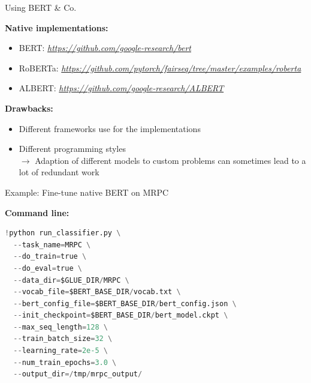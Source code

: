 \documentclass[]{beamer}
\begin{document}
\begin{frame}{Using BERT \& Co.}

\textbf{Native implementations:}

		\begin{itemize}
			\item BERT: \href{https://github.com/google-research/bert}{\textit{https://github.com/google-research/bert}}
			\item RoBERTa: \small\href{https://github.com/pytorch/fairseq/tree/master/examples/roberta}{\textit{https://github.com/pytorch/fairseq/tree/master/examples/roberta}}\normalsize
			\item ALBERT: \href{https://github.com/google-research/ALBERT}{\textit{https://github.com/google-research/ALBERT}}\normalsize
		\end{itemize}

\vspace{.3cm}

\textbf{Drawbacks:}

		\begin{itemize}
			\item Different frameworks use for the implementations
			\item Different programming styles\\
						$\rightarrow$ Adaption of different models to custom problems can sometimes lead to a lot of redundant work
		\end{itemize}
\end{frame}



\begin{frame}[fragile]{Example: Fine-tune native BERT on MRPC}

\textbf{Command line:}
\vspace{-.2cm}
\begin{lstlisting}[language=Python]
	!python run_classifier.py \
  --task_name=MRPC \
  --do_train=true \
  --do_eval=true \
  --data_dir=$GLUE_DIR/MRPC \
  --vocab_file=$BERT_BASE_DIR/vocab.txt \
  --bert_config_file=$BERT_BASE_DIR/bert_config.json \
  --init_checkpoint=$BERT_BASE_DIR/bert_model.ckpt \
  --max_seq_length=128 \
  --train_batch_size=32 \
  --learning_rate=2e-5 \
  --num_train_epochs=3.0 \
  --output_dir=/tmp/mrpc_output/
\end{lstlisting}
\end{frame}
\end{document}
